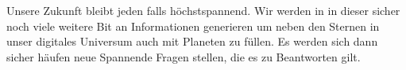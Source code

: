 Unsere Zukunft bleibt jeden falls höchstspannend. Wir werden in in dieser sicher noch viele weitere Bit an Informationen generieren um neben den Sternen in unser digitales Universum auch mit Planeten zu füllen. Es werden sich dann sicher häufen neue Spannende Fragen stellen, die es zu Beantworten gilt.